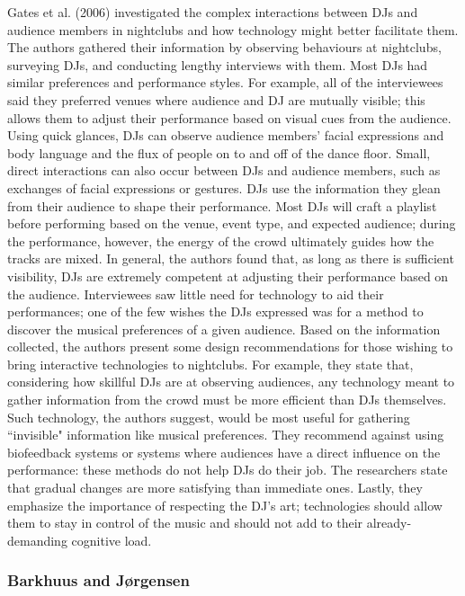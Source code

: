 Gates et al. (2006) investigated the complex interactions between DJs and audience members in nightclubs and how technology might better facilitate them. The authors gathered their information by observing behaviours at nightclubs, surveying DJs, and conducting lengthy interviews with them. Most DJs had similar preferences and performance styles. For example, all of the interviewees said they preferred venues where audience and DJ are mutually visible; this allows them to adjust their performance based on visual cues from the audience. Using quick glances, DJs can observe audience members' facial expressions and body language and the flux of people on to and off of the dance floor. Small, direct interactions can also occur between DJs and audience members, such as exchanges of facial expressions or gestures. DJs use the information they glean from their audience to shape their performance. Most DJs will craft a playlist before performing based on the venue, event type, and expected audience; during the performance, however, the energy of the crowd ultimately guides how the tracks are mixed. In general, the authors found that, as long as there is sufficient visibility, DJs are extremely competent at adjusting their performance based on the audience. Interviewees saw little need for technology to aid their performances; one of the few wishes the DJs expressed was for a method to discover the musical preferences of a given audience. Based on the information collected, the authors present some design recommendations for those wishing to bring interactive technologies to nightclubs. For example, they state that, considering how skillful DJs are at observing audiences, any technology meant to gather information from the crowd must be more efficient than DJs themselves. Such technology, the authors suggest, would be most useful for gathering ``invisible" information like musical preferences. They recommend against using biofeedback systems or systems where audiences have a direct influence on the performance: these methods do not help DJs do their job. The researchers state that gradual changes are more satisfying than immediate ones. Lastly, they emphasize the importance of respecting the DJ's art; technologies should allow them to stay in control of the music and should not add to their already-demanding cognitive load.

\subsubsection{Barkhuus and J{\o}rgensen}

